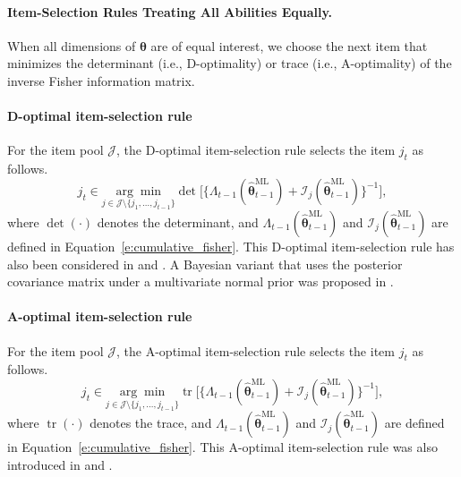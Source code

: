 \documentclass[12pt]{article}
\newcommand{\bftheta}{\boldsymbol{\theta}}
\begin{document}
\paragraph{Item-Selection Rules Treating All Abilities Equally.}
When all dimensions of $\bftheta$ are of equal interest, we choose the next item that minimizes the determinant (i.e., D-optimality) or trace (i.e., A-optimality) of the inverse Fisher information matrix.

\paragraph{D-optimal item-selection rule} 
For the item pool $\mathcal{J}$, the D-optimal item-selection rule selects the item $j_t$ as follows.
\begin{equation} \label{e:d-optimal}
 j_t \in \underset{j \in \mathcal{J} \setminus \{j_1, \ldots, j_{t-1}\}}{\arg \min} \operatorname{det} \Big[ \Big\{ \Lambda_{t-1}( \hat{\bftheta}_{t-1}^{\mathrm{ML}}) + \mathcal{I}_j(\hat{\bftheta}_{t-1}^{\mathrm{ML}}) \Big\}^{-1} \Big],
\end{equation}
where $\operatorname{det}(\cdot)$ denotes the determinant, and $\Lambda_{t-1}(\hat{\bftheta}_{t-1}^{\mathrm{ML}})$ and $\mathcal{I}_j(\hat{\boldsymbol{\theta}}_{t-1}^{\mathrm{ML}})$ are defined in Equation~\eqref{e:cumulative_fisher}. This D-optimal item-selection rule has also been considered in  and . A Bayesian variant that uses the posterior covariance matrix under a multivariate normal prior was proposed in .


\paragraph{A-optimal item-selection rule} 
For the item pool $\mathcal{J}$, the A-optimal item-selection rule selects the item $j_t$ as follows.
\begin{equation} \label{e:a-optimal}
 j_t \in \underset{j \in \mathcal{J} \setminus \{j_1, \ldots, j_{t-1}\}}{\arg \min} \operatorname{tr} \Big[ \Big\{ \Lambda_{t-1}( \hat{\bftheta}_{t-1}^{\mathrm{ML}}) + \mathcal{I}_j(\hat{\bftheta}_{t-1}^{\mathrm{ML}}) \Big\}^{-1} \Big],
\end{equation}
where $\operatorname{tr}(\cdot)$ denotes the trace, and $\Lambda_{t-1}(\hat{\bftheta}_{t-1}^{\mathrm{ML}})$ and $\mathcal{I}_j(\hat{\boldsymbol{\theta}}_{t-1}^{\mathrm{ML}})$ are defined in Equation~\eqref{e:cumulative_fisher}. This A-optimal item-selection rule was also introduced in  and . 
\end{document}

